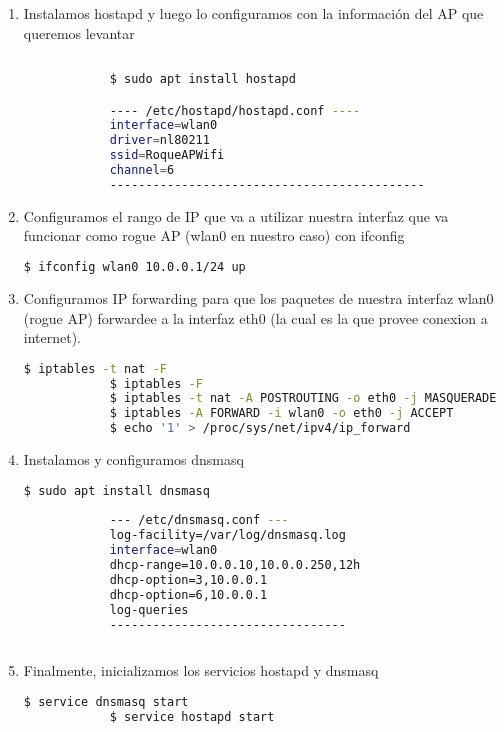\begin{enumerate}

	\item Instalamos hostapd y luego lo configuramos con la información del AP que queremos levantar
	
		\begin{lstlisting}[language=bash]
		
			$ sudo apt install hostapd

			---- /etc/hostapd/hostapd.conf ----
			interface=wlan0
			driver=nl80211
			ssid=RoqueAPWifi
			channel=6
			--------------------------------------------

		\end{lstlisting}
		
		
	\item Configuramos el rango de IP que va a utilizar nuestra interfaz que va funcionar como rogue AP (wlan0 en nuestro caso) con ifconfig
		
		\begin{lstlisting}[language=bash]
			$ ifconfig wlan0 10.0.0.1/24 up
		\end{lstlisting}
		
	\item Configuramos IP forwarding para que los paquetes de nuestra interfaz wlan0 (rogue AP) forwardee a la interfaz eth0 (la cual es la que provee conexion a internet).
		
		\begin{lstlisting}[language=bash]
			$ iptables -t nat -F
			$ iptables -F
			$ iptables -t nat -A POSTROUTING -o eth0 -j MASQUERADE
			$ iptables -A FORWARD -i wlan0 -o eth0 -j ACCEPT
			$ echo '1' > /proc/sys/net/ipv4/ip_forward
		\end{lstlisting}
		
	\item Instalamos y configuramos dnsmasq
		
		\begin{lstlisting}[language=bash]
			$ sudo apt install dnsmasq
			
			--- /etc/dnsmasq.conf ---
			log-facility=/var/log/dnsmasq.log
			interface=wlan0
			dhcp-range=10.0.0.10,10.0.0.250,12h
			dhcp-option=3,10.0.0.1
			dhcp-option=6,10.0.0.1
			log-queries
			---------------------------------
			
		\end{lstlisting}
		
	\item Finalmente, inicializamos los servicios hostapd y dnsmasq
		
		\begin{lstlisting}[language=bash]
			$ service dnsmasq start	
			$ service hostapd start
		\end{lstlisting}
	
\end{enumerate}
	
